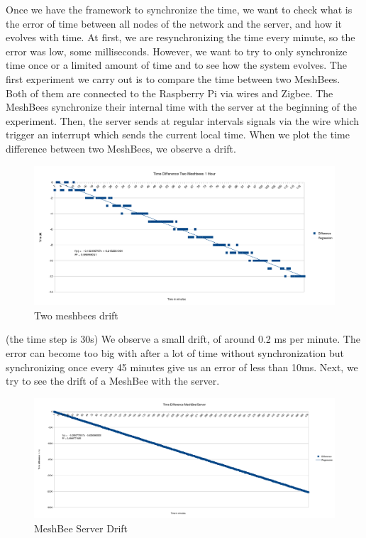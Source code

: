 Once we have the framework to synchronize the time, we want to check what is the error of time between all nodes of the network and the server, and how it evolves with time. At first, we are resynchronizing the time every minute, so the error was low, some milliseconds. However, we want to try to only synchronize time once or a limited amount of time and to see how the system evolves. The first experiment we carry out is to compare the time between two MeshBees. Both of them are connected to the Raspberry Pi via wires and Zigbee. The MeshBees synchronize their internal time with the server at the beginning of the experiment. Then, the server sends at regular intervals signals via the wire which trigger an interrupt which sends the current local time. When we plot the time difference between two MeshBees, we observe a drift.

\begin{figure}[ht]
\centering
\includegraphics[width=.6\linewidth]{time_sync_1_hour_2meshbees}
\caption[Two meshbees drift]{\label{f:time_sync_1_hour_2meshbees}Two meshbees drift}
\end{figure}

(the time step is 30s) We observe a small drift, of around 0.2 ms per minute. The error can become too big with after a lot of time without synchronization but synchronizing once every 45 minutes give us an error of less than 10ms. Next, we try to see the drift of a MeshBee with the server.

\begin{figure}[ht]
\centering
\includegraphics[width=.6\linewidth]{time_sync_8_hours_meshbee_server}
\caption[Meshbee Server Drift]{\label{f:time_sync_8_hours_meshbee_server}MeshBee Server Drift}
\end{figure}

